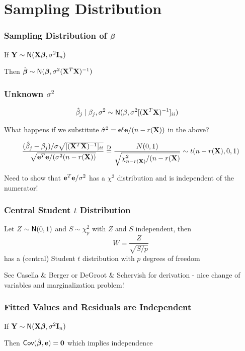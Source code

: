\documentclass[handout]{beamer}
\begin{document}
\section{Sampling Distribution}



\begin{frame}
  \frametitle{Sampling Distribution of $\boldsymbol{\beta}$}
If  $\mathbf{Y} \sim \textsf{N}(\mathbf{X}\boldsymbol{\beta}, \sigma^2 \mathbf{I}_n)$

Then $\hat{\boldsymbol{\beta}} \sim \textsf{N}(\boldsymbol{\beta}, \sigma^2 (\mathbf{X}^T\mathbf{X})^{-1})$
\vfill

\end{frame}


\begin{frame} \frametitle{Unknown $\sigma^2$}

  \begin{align*}
    \hat{\beta}_j \mid \beta_j, \sigma^2 & \sim \textsf{N}(\beta, { \sigma^2}
                                           [(\mathbf{X}^T\mathbf{X})^{-1}]_{ii})
  \end{align*}  \pause

What happens if we substitute $\hat{\sigma}^2 = \mathbf{e}^t\mathbf{e}/(n-r(\mathbf{X}))$ in the above? \pause

$$
\frac{(\hat{\beta}_j - \beta_j)/ \sigma \sqrt{ [(\mathbf{X}^T\mathbf{X})^{-1}]_{ii}}}
{\sqrt{\mathbf{e}^T\mathbf{e}/ (\sigma^2 (n - r(\mathbf{X}))} } \mathrel{\mathop{=}\limits^{\rm D}}
\frac{N(0,1)}{\sqrt{\chi_{n-r(\mathbf{X})}^2/(n - r(\mathbf{X})}} \sim t(n - r(\mathbf{X}), 0 ,1)
$$

Need to show that $\mathbf{e}^T\mathbf{e} /\sigma^2$ has a $\chi^2$ distribution and
is independent of the numerator!
\end{frame}

\begin{frame}
  \frametitle{Central Student $t$ Distribution}
  \begin{definition}
    Let $Z \sim \textsf{N}(0, 1)$ and $S \sim \chi^2_p$ with $Z$ and $S$
    independent, \pause then
 $$ W = \frac{Z} {\sqrt{S/p}}$$
has a (central) Student $t$ distribution with $p$ degrees of freedom
  \end{definition}
\pause
 
See Casella \& Berger or DeGroot \& Schervish for derivation - nice change of variables and marginalization problem!
\end{frame}



\begin{frame}
  \frametitle{ Fitted Values and Residuals are Independent}
If  $\mathbf{Y} \sim \textsf{N}(\mathbf{X}\boldsymbol{\beta}, \sigma^2 \mathbf{I}_n)$

Then $\textsf{Cov}(\hat{\boldsymbol{\beta}}, \mathbf{e}) = \mathbf{0}$ which implies independence 
\vfill

\end{frame}
\end{document}
